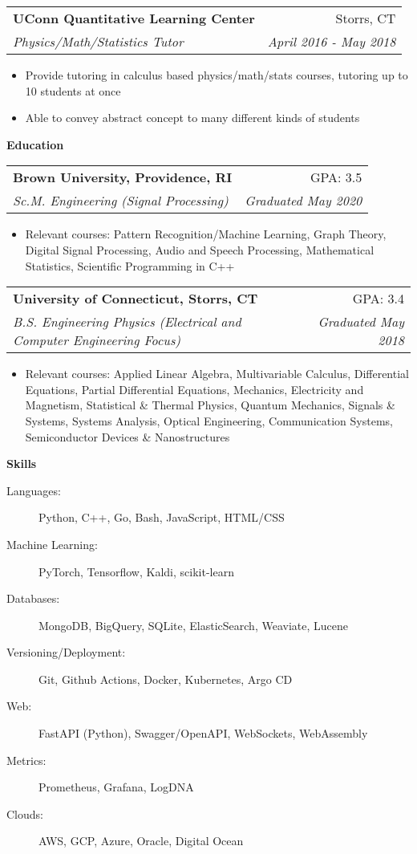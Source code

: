 \documentclass[letterpaper,11pt]{article}
\makeatletter
\newcommand{\resitem}[1]{\item #1 \vspace{-2pt}}
\newcommand{\resheading}[1]{{\large \colorbox{mygrey}{\begin{minipage}{\textwidth}{\textbf{#1 \vphantom{p\^{E}}}}\end{minipage}}}}
\newcommand{\ressubheading}[4]{
\begin{tabular*}{6.9in}{l@{\extracolsep{\fill}}r}
		\textbf{#1} & #2 \\
		\textit{#3} & \textit{#4} \\
\end{tabular*}\vspace{-6pt}}
\makeatother
\begin{document}
\begin{description}
\item
	\ressubheading{UConn Quantitative Learning Center}{Storrs, CT}{Physics/Math/Statistics Tutor}{April 2016 - May 2018}
	\begin{itemize}
		\resitem{Provide tutoring in calculus based physics/math/stats courses, tutoring up to 10 students at once}
		\resitem{Able to convey abstract concept to many different kinds of students}
	\end{itemize}
\end{description}


\resheading{Education}
\begin{description}
\item
	\ressubheading{Brown University, Providence, RI}{GPA: 3.5}{Sc.M. Engineering (Signal Processing)}{Graduated May 2020}
	\begin{itemize}
		\resitem{Relevant courses: Pattern Recognition/Machine Learning, Graph Theory, Digital Signal Processing, Audio and Speech Processing, Mathematical Statistics, Scientific Programming in C++}
	\end{itemize}

\item
	\ressubheading{University of Connecticut, Storrs, CT}{GPA: 3.4}{B.S. Engineering Physics (Electrical and Computer Engineering Focus)}{Graduated May 2018}
	\begin{itemize}
		\resitem{Relevant courses: Applied Linear Algebra, Multivariable Calculus, Differential Equations, Partial Differential Equations, Mechanics, Electricity and Magnetism, Statistical \& Thermal Physics, Quantum Mechanics, Signals \& Systems, Systems Analysis, Optical Engineering, Communication Systems, Semiconductor Devices \& Nanostructures}
	\end{itemize}

\end{description}

\resheading{Skills}
\begin{description}
    \item[Languages:]
    Python, C++, Go, Bash, JavaScript, HTML/CSS
    \item[Machine Learning:]
    PyTorch, Tensorflow, Kaldi, scikit-learn
    \item[Databases:]
    MongoDB, BigQuery, SQLite, ElasticSearch, Weaviate, Lucene
    \item[Versioning/Deployment:]
    Git, Github Actions, Docker, Kubernetes, Argo CD
    \item[Web:]
    FastAPI (Python), Swagger/OpenAPI, WebSockets, WebAssembly
    \item[Metrics:]
    Prometheus, Grafana, LogDNA
    \item[Clouds:]
    AWS, GCP, Azure, Oracle, Digital Ocean
\end{description}
\end{document}
